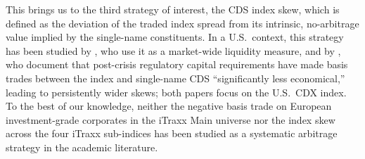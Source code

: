 This brings us to the third strategy of interest, the CDS index skew,
which is defined as the deviation of the traded index spread from its
intrinsic, no-arbitrage value implied by the single-name
constituents. In a U.S.\ context, this strategy has been studied by
\citet{junge2015liquidity}, who use it as a market-wide liquidity
measure, and by \citet{boyarchenko2016trends}, who document that
post-crisis regulatory capital requirements have made basis trades
between the index and single-name CDS ``significantly less
economical,'' leading to persistently wider skews; both papers focus
on the U.S.\ CDX index. To the best of our knowledge, neither the
negative basis trade on European investment-grade corporates in the
iTraxx Main universe nor the index skew across the four iTraxx
sub-indices has been studied as a systematic arbitrage strategy in
the academic literature.

